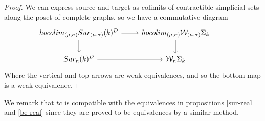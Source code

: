 \begin{proof}
	We can express source and target as colimits of contractible %
	simplicial sets along the poset of complete graphs,
	so we have a commutative diagram
	\begin{equation*}
		\begin{tikzcd}
			hocolim_{(\mu,\sigma)}Sur_{(\mu,\sigma)}(k)^{D} \arrow[r] \arrow[d]& hocolim_{(\mu,\sigma)}\mathcal{W}_{(\mu,\sigma)}\Sigma_{k} \arrow[d] \\
			Sur_{n}(k)^{D}\arrow[r] & \mathcal{W}_{n}\Sigma_{k}&
		\end{tikzcd}
	\end{equation*}
	Where the vertical and top arrows
	are weak equivalences, and so the bottom map is a weak equivalence.
\end{proof}
We remark that $tc$ is compatible with the equivalences in propositions \ref{sur-real} and \ref{be-real} since they are proved to be equivalences by a similar method.




